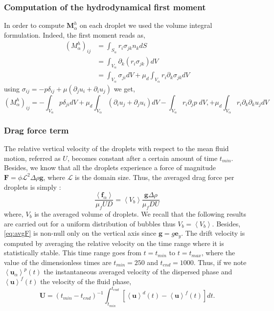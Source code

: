 \subsubsection{Computation of the hydrodynamical first moment}

In order to compute $\bm{M}^h_\alpha$ on each droplet we used the volume integral formulation.
Indeed, the first moment reads as,
\begin{align}
    (M^h_\alpha)_{ij}
    & = \int_{S_\alpha} r_i \sigma_{jk} n_k dS \\
    & = \int_{V_\alpha} \partial_k \left( r_i \sigma_{jk} \right) dV \\
    &= \int_{V_\alpha} \sigma_{ji}  dV
    + \mu_d \int_{V_\alpha} r_i \partial_k\sigma_{jk} dV
\end{align}
using $\sigma_{ij} = -p\delta_{ij} + \mu \left(\partial_j u_i + \partial_i u_j\right)$ we get, 
\begin{equation}
    (M^h_\alpha)_{ij}
    = - \int_{V_\alpha} p\delta_{ji}  dV
    +  \mu_d\int_{V_\alpha} \left(\partial_i u_j+\partial_j u_i\right)dV
    - \int_{V_\alpha} r_i \partial_j p \;dV,
    + \mu_d \int_{V_\alpha} r_i \partial_k\partial_k u_j dV
\end{equation} 

\subsubsection{Drag force term}
The relative vertical velocity of the droplets with respect to the mean fluid motion, referred as $U$, becomes constant after a certain amount of time $t_{min}$.
Besides, we know that all the droplets experience a force of magnitude $\bm{F} = \phi \mathcal{L}^2 \Delta \rho \bm{g}$, where $\mathcal{L}$ is the domain size.
Thus, the averaged drag force per droplets is simply :
\begin{equation}
    \frac{\left<\bm{f}_\alpha\right>}{\mu_f UD} = \left<V_b\right>\frac{\bm{g}\Delta \rho }{\mu_f D U}
    \label{eq:avgF}
\end{equation}  
where, $V_b$ is the averaged volume of droplets. 
We recall that the following results are carried out for a uniform distribution of bubbles thus $V_b = \left<V_b\right>$.
Besides, \ref{eq:avgF} is non-null only on the vertical axis since $\bm{g} = g \bm{e}_y$. 
The drift velocity is computed by averaging the relative velocity on the time range where it is statistically stable.
This time range goes from $t = t_{min}$ to $t = t_{max}$, where the value of the dimensionless times are $t_{min} = 250$ and $t_{end} = 1000$. 
Thus, if we note $\left<\bm{u}_\alpha\right>^p(t)$ the instantaneous averaged velocity of the dispersed phase and $\left<\bm{u}\right>^f(t)$ the velocity of the fluid phase,
\begin{equation}
    \bm{U} =\left(t_{min}-t_{end}\right)^{-1}\int_{t_{min}}^{t_{end}}\left[\left<\bm{u}\right>^d(t)-\left<\bm{u}\right>^f(t)\right] dt.
\end{equation}

